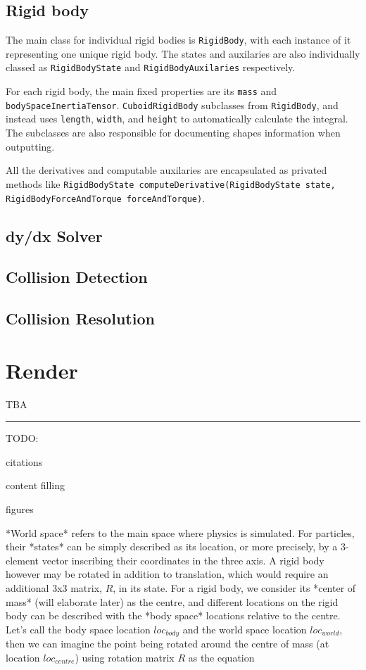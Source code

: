 \documentclass[runningheads]{llncs}
\newcommand{\code}{\texttt}
\begin{document}
\subsection{Rigid body}

The main class for individual rigid bodies is \code{RigidBody}, with each instance of it representing one unique rigid body. The states and auxilaries are also individually classed as \code{RigidBodyState} and \code{RigidBodyAuxilaries} respectively.

For each rigid body, the main fixed properties are its \code{mass} and \code{bodySpaceInertiaTensor}. \code{CuboidRigidBody} subclasses from \code{RigidBody}, and instead uses \code{length}, \code{width}, and \code{height} to automatically calculate the integral. The subclasses are also responsible for documenting shapes information when outputting.

All the derivatives and computable auxilaries are encapsulated as privated methods like \code{RigidBodyState computeDerivative(RigidBodyState state, RigidBodyForceAndTorque forceAndTorque)}.

\subsection{dy/dx Solver}



\subsection{Collision Detection}

\subsection{Collision Resolution}

\section{Render}


TBA

\noindent\rule{12cm}{0.4pt}

TODO:

citations

content filling

figures

*World space* refers to the main space where physics is simulated. For particles, their *states* can be simply described as its location, or more precisely, by a 3-element vector inscribing their coordinates in the three axis. A rigid body however may be rotated in addition to translation, which would require an additional 3x3 matrix, $R$, in its state. For a rigid body, we consider its *center of mass* (will elaborate later) as the centre, and different locations on the rigid body can be described with the *body space* locations relative to the centre. Let's call the body space location $loc_{body}$ and the world space location $loc_{world}$, then we can imagine the point being rotated around the centre of mass (at location $loc_{centre}$) using rotation matrix $R$ as the equation
\end{document}
